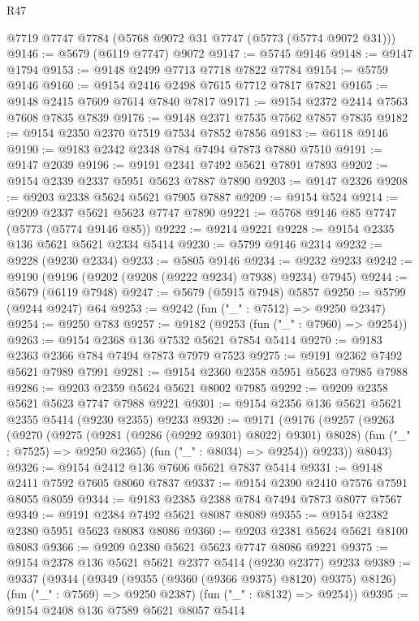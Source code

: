 \begin{lexlean}{R47}
\begin{coremodule}
    @7719
    @7747
    @7784
    (@5768 @9072 @31 @7747 (@5773 (@5774 @9072 @31)))
@9146 := @5679 (@6119 @7747) @9072
@9147 := @5745 @9146
@9148 := @9147 @1794
@9153 := @9148 @2499 @7713 @7718 @7822 @7784
@9154 := @5759 @9146
@9160 := @9154 @2416 @2498 @7615 @7712 @7817 @7821
@9165 := @9148 @2415 @7609 @7614 @7840 @7817
@9171 := @9154 @2372 @2414 @7563 @7608 @7835 @7839
@9176 := @9148 @2371 @7535 @7562 @7857 @7835
@9182 := @9154 @2350 @2370 @7519 @7534 @7852 @7856
@9183 := @6118 @9146
@9190 := @9183 @2342 @2348 @784 @7494 @7873 @7880 @7510
@9191 := @9147 @2039
@9196 := @9191 @2341 @7492 @5621 @7891 @7893
@9202 := @9154 @2339 @2337 @5951 @5623 @7887 @7890
@9203 := @9147 @2326
@9208 := @9203 @2338 @5624 @5621 @7905 @7887
@9209 := @9154 @524
@9214 := @9209 @2337 @5621 @5623 @7747 @7890
@9221 := @5768 @9146 @85 @7747 (@5773 (@5774 @9146 @85))
@9222 := @9214 @9221
@9228 := @9154 @2335 @136 @5621 @5621 @2334 @5414
@9230 := @5799 @9146 @2314
@9232 := @9228 (@9230 @2334)
@9233 := @5805 @9146
@9234 := @9232 @9233
@9242 := @9190 (@9196 (@9202 (@9208 (@9222 @9234) @7938) @9234) @7945)
@9244 := @5679 (@6119 @7948)
@9247 := @5679 (@5915 @7948) @5857
@9250 := @5799 (@9244 @9247) @64
@9253 := @9242 (fun ("_" : @7512) => @9250 @2347)
@9254 := @9250 @783
@9257 := @9182 (@9253 (fun ("_" : @7960) => @9254))
@9263 := @9154 @2368 @136 @7532 @5621 @7854 @5414
@9270 := @9183 @2363 @2366 @784 @7494 @7873 @7979 @7523
@9275 := @9191 @2362 @7492 @5621 @7989 @7991
@9281 := @9154 @2360 @2358 @5951 @5623 @7985 @7988
@9286 := @9203 @2359 @5624 @5621 @8002 @7985
@9292 := @9209 @2358 @5621 @5623 @7747 @7988 @9221
@9301 := @9154 @2356 @136 @5621 @5621 @2355 @5414 (@9230 @2355) @9233
@9320 := @9171
    (@9176
      (@9257
        (@9263
          (@9270
            (@9275 (@9281 (@9286 (@9292 @9301) @8022) @9301) @8028)
            (fun ("_" : @7525) => @9250 @2365)
            (fun ("_" : @8034) => @9254))
          @9233))
      @8043)
@9326 := @9154 @2412 @136 @7606 @5621 @7837 @5414
@9331 := @9148 @2411 @7592 @7605 @8060 @7837
@9337 := @9154 @2390 @2410 @7576 @7591 @8055 @8059
@9344 := @9183 @2385 @2388 @784 @7494 @7873 @8077 @7567
@9349 := @9191 @2384 @7492 @5621 @8087 @8089
@9355 := @9154 @2382 @2380 @5951 @5623 @8083 @8086
@9360 := @9203 @2381 @5624 @5621 @8100 @8083
@9366 := @9209 @2380 @5621 @5623 @7747 @8086 @9221
@9375 := @9154 @2378 @136 @5621 @5621 @2377 @5414 (@9230 @2377) @9233
@9389 := @9337
    (@9344
      (@9349 (@9355 (@9360 (@9366 @9375) @8120) @9375) @8126)
      (fun ("_" : @7569) => @9250 @2387)
      (fun ("_" : @8132) => @9254))
@9395 := @9154 @2408 @136 @7589 @5621 @8057 @5414

\end{coremodule}
\end{lexlean}
